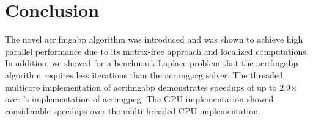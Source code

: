 \section{Conclusion}
The novel \gls{acr:fmgabp} algorithm was introduced and was shown to achieve high parallel performance due to its matrix-free approach and localized computations.
In addition, we showed for a benchmark Laplace problem that the \gls{acr:fmgabp} algorithm requires less iterations than the \gls{acr:mgpcg} solver.
The threaded multicore implementation of \gls{acr:fmgabp} demonstrates speedups of up to 2.9$\times$ over 's implementation of \gls{acr:mgpcg}.
The GPU implementation showed considerable speedups over the multithreaded CPU implementation.





